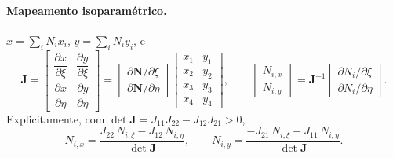 \documentclass[11pt,a4paper]{article}
\numberwithin{equation}{section}
\begin{document}
\paragraph{Mapeamento isoparamétrico.} $x=\sum_iN_ix_i$, $y=\sum_iN_iy_i$, e
\begin{equation}
\boxed{\mathbf J=\begin{bmatrix}
\dfrac{\partial x}{\partial\xi}&\dfrac{\partial y}{\partial\xi}\\[6pt]
\dfrac{\partial x}{\partial\eta}&\dfrac{\partial y}{\partial\eta}
\end{bmatrix}
=\begin{bmatrix}\partial\mathbf N/\partial\xi\\ \partial\mathbf N/\partial\eta\end{bmatrix}
\begin{bmatrix}x_1&y_1\\x_2&y_2\\x_3&y_3\\x_4&y_4\end{bmatrix},
\qquad
\begin{bmatrix}N_{i,x}\\ N_{i,y}\end{bmatrix}
=\mathbf J^{-1}
\begin{bmatrix}\partial N_i/\partial\xi\\ \partial N_i/\partial\eta\end{bmatrix}.}
\end{equation}
Explicitamente, com $\det\mathbf J=J_{11}J_{22}-J_{12}J_{21}>0$,
\begin{equation}
N_{i,x}=\frac{J_{22}\,N_{i,\xi}-J_{12}\,N_{i,\eta}}{\det\mathbf J},\qquad
N_{i,y}=\frac{-J_{21}\,N_{i,\xi}+J_{11}\,N_{i,\eta}}{\det\mathbf J}.
\end{equation}
\end{document}
